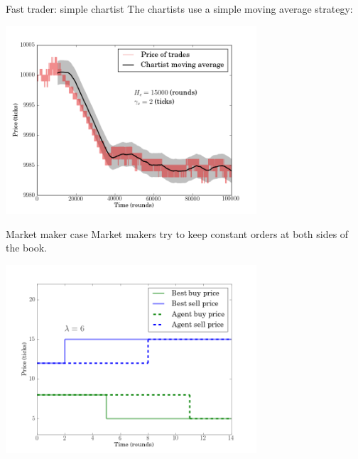 \documentclass[14pt]{beamer}
\begin{document}

\begin{frame}{Fast trader: simple chartist}
The chartists use a simple moving average strategy:
\begin{center}
\includegraphics[width=0.7\textwidth]{chartist/h.png}
\end{center}
\end{frame}




\begin{frame}{Market maker case}
Market makers try to keep constant orders at both sides of the book.
\begin{center}
\includegraphics[width=0.7\textwidth]{marketmaker/a.png}
\end{center}
\end{frame}
\end{document}
